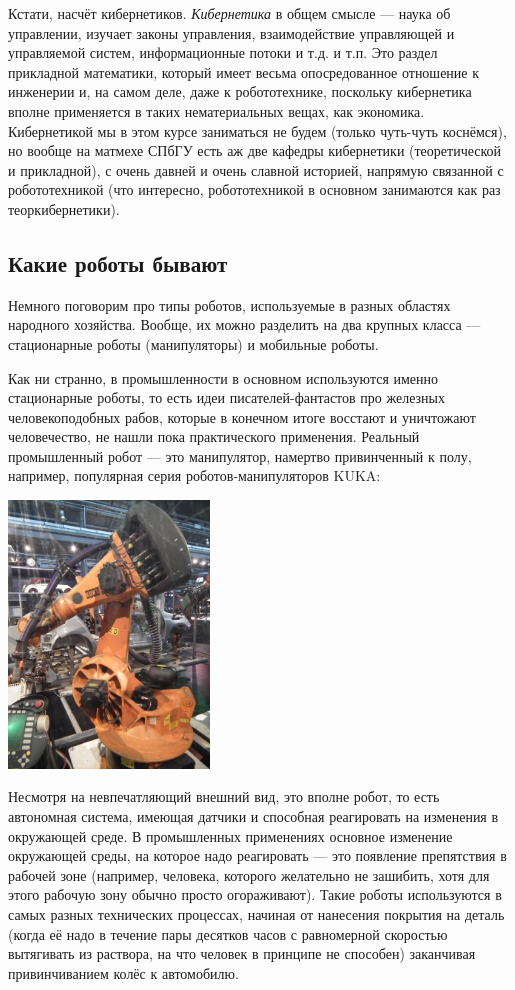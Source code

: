 \documentclass{../../text-style}
\begin{document}
Кстати, насчёт кибернетиков.
\emph{Кибернетика} в общем смысле --- наука об управлении, изучает законы управления, взаимодействие управляющей и управляемой систем, информационные потоки и т.д. и т.п.
Это раздел прикладной математики, который имеет весьма опосредованное отношение к инженерии и, на самом деле, даже к робототехнике, поскольку кибернетика вполне применяется в таких нематериальных вещах, как экономика.
Кибернетикой мы в этом курсе заниматься не будем (только чуть-чуть коснёмся), но вообще на матмехе СПбГУ есть аж две кафедры кибернетики (теоретической и прикладной), с очень давней и очень славной историей, напрямую связанной с робототехникой (что интересно, робототехникой в основном занимаются как раз теоркибернетики).

\subsection{Какие роботы бывают}

Немного поговорим про типы роботов, используемые в разных областях народного хозяйства. 
Вообще, их можно разделить на два крупных класса --- стационарные роботы (манипуляторы) и мобильные роботы.

Как ни странно, в промышленности в основном используются именно стационарные роботы, то есть идеи писателей-фантастов про железных человекоподобных рабов, которые в конечном итоге восстают и уничтожают человечество, не нашли пока практического применения.
Реальный промышленный робот --- это манипулятор, намертво привинченный к полу, например, популярная серия роботов-манипуляторов KUKA:

\begin{center}
    \includegraphics[width=0.4\textwidth]{kuka.png}
\end{center}

Несмотря на невпечатляющий внешний вид, это вполне робот, то есть автономная система, имеющая датчики и способная реагировать на изменения в окружающей среде.
В промышленных применениях основное изменение окружающей среды, на которое надо реагировать --- это появление препятствия в рабочей зоне (например, человека, которого желательно не зашибить, хотя для этого рабочую зону обычно просто огораживают).
Такие роботы используются в самых разных технических процессах, начиная от нанесения покрытия на деталь (когда её надо в течение пары десятков часов с равномерной скоростью вытягивать из раствора, на что человек в принципе не способен) заканчивая привинчиванием колёс к автомобилю.
\end{document}
